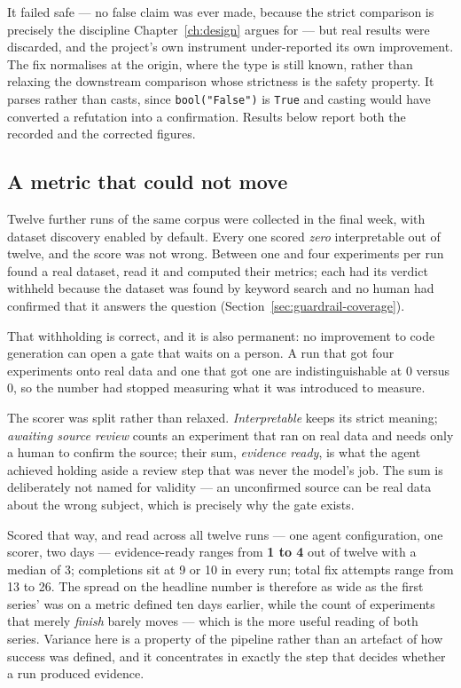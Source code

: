 It failed safe --- no false claim was ever made, because the strict comparison is
precisely the discipline Chapter~\ref{ch:design} argues for --- but real results
were discarded, and the project's own instrument under-reported its own
improvement. The fix normalises at the origin, where the type is still known,
rather than relaxing the downstream comparison whose strictness is the safety
property. It parses rather than casts, since \texttt{bool("False")} is
\texttt{True} and casting would have converted a refutation into a confirmation.
Results below report both the recorded and the corrected figures.

\subsection{A metric that could not move}
\label{sec:evidence-ready}

Twelve further runs of the same corpus were collected in the final week, with
dataset discovery enabled by default. Every one scored \emph{zero} interpretable
out of twelve, and the score was not wrong. Between one and four experiments per
run found a real dataset, read it and computed their metrics; each had its verdict
withheld because the dataset was found by keyword search and no human had
confirmed that it answers the question (Section~\ref{sec:guardrail-coverage}).

That withholding is correct, and it is also permanent: no improvement to code
generation can open a gate that waits on a person. A run that got four experiments
onto real data and one that got one are indistinguishable at $0$ versus $0$, so the
number had stopped measuring what it was introduced to measure.

The scorer was split rather than relaxed. \emph{Interpretable} keeps its strict
meaning; \emph{awaiting source review} counts an experiment that ran on real data
and needs only a human to confirm the source; their sum, \emph{evidence ready}, is
what the agent achieved holding aside a review step that was never the model's job.
The sum is deliberately not named for validity --- an unconfirmed source can be real
data about the wrong subject, which is precisely why the gate exists.

Scored that way, and read across all twelve runs --- one agent configuration, one
scorer, two days --- evidence-ready ranges from \textbf{1 to 4} out of twelve with
a median of 3; completions sit at 9 or 10 in every run; total fix attempts range
from 13 to 26. The spread on the headline number is therefore as
wide as the first series' was on a metric defined ten days earlier, while the
count of experiments that merely \emph{finish} barely moves --- which is the more
useful reading of both series. Variance here is a property of the pipeline rather
than an artefact of how success was defined, and it concentrates in exactly the
step that decides whether a run produced evidence.

